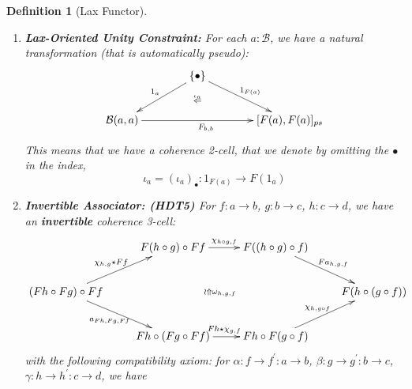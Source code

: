 \documentclass{article}
\numberwithin{equation}{section}
\theoremstyle{definition}
\theoremstyle{plain}
\newtheorem{definition}[equation]{Definition}
\begin{document}
\begin{definition}[Lax Functor]
\begin{enumerate}[label = $\bullet$]
		\item \textbf{Lax-Oriented Unity Constraint:} For each $a:\mathcal{B}$, we have a natural transformation (that is automatically pseudo):
		\[\xymatrix@C=4em{
			& \{\bullet\} \ar[dl]_{1_a} \ar@{}[d]|{\overset{\iota_a}{\Leftarrow}} \ar[dr]^{1_{F(a)}}\\
			\mathcal{B}(a,a) \ar[rr]_{F_{b,b}} && [F(a), F(a)]_{ps}
		}\]
		This means that we have a coherence 2-cell, that we denote by omitting the $\bullet$ in the index,
		\[\iota_a = (\iota_a)_{\bullet}: 1_{F(a)} \to F(1_a)\]
		\item \textbf{Invertible Associator: (HDT5)} For $f:a\to b$, $g:b \to c$, $h:c \to d$, we have an \textbf{invertible} coherence 3-cell:
		\[\xymatrix{
			& F(h\circ g) \circ Ff \ar[r]^{\chi_{h\circ g, f}} & F((h\circ g)\circ f) \ar[dr]^{Fa_{h,g,f}}\\
			(Fh\circ Fg)\circ Ff \ar[ur]^{\chi_{h,g}\star Ff} \ar[dr]_{a_{Fh, Fg, Ff}} \ar@{}[rrr]|{\wr\Uparrow \omega_{h,g,f}} &&& F(h \circ (g\circ f))\\
			& Fh\circ (Fg \circ Ff) \ar[r]^{Fh \star \chi_{g, f}} & Fh\circ F(g \circ f) \ar[ur]^{\chi_{h,g\circ f}}\\
		}\]
		with the following compatibility axiom: for $\alpha: f \to f^{\prime}:a\to b$, $\beta: g \to g^{\prime}:b \to c$, $\gamma: h\to h^{\prime}:c \to d$, we have
		

\end{enumerate}
\end{definition}
\end{document}
